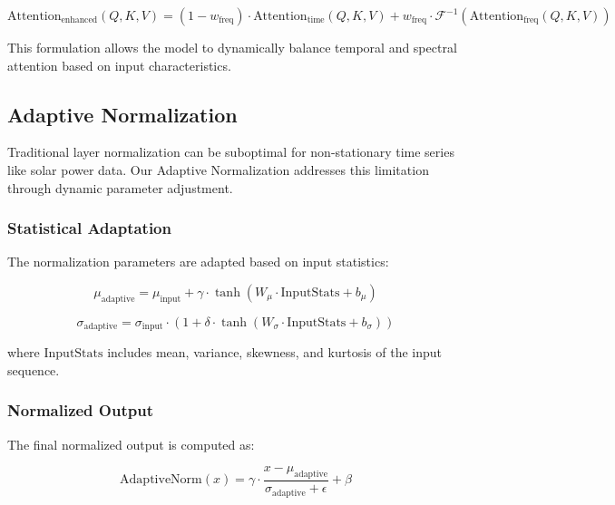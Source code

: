 \documentclass[12pt]{uomthesis}
\begin{document}
\begin{equation}
\text{Attention}_{\text{enhanced}}(Q, K, V) = (1-w_{\text{freq}}) \cdot \text{Attention}_{\text{time}}(Q, K, V) + w_{\text{freq}} \cdot \mathcal{F}^{-1}(\text{Attention}_{\text{freq}}(Q, K, V))
\end{equation}

This formulation allows the model to dynamically balance temporal and spectral attention based on input characteristics.

\subsection{Adaptive Normalization}

Traditional layer normalization can be suboptimal for non-stationary time series like solar power data. Our Adaptive Normalization addresses this limitation through dynamic parameter adjustment.

\subsubsection{Statistical Adaptation}

The normalization parameters are adapted based on input statistics:

\begin{equation}
\mu_{\text{adaptive}} = \mu_{\text{input}} + \gamma \cdot \tanh(W_{\mu} \cdot \text{InputStats} + b_{\mu})
\end{equation}

\begin{equation}
\sigma_{\text{adaptive}} = \sigma_{\text{input}} \cdot (1 + \delta \cdot \tanh(W_{\sigma} \cdot \text{InputStats} + b_{\sigma}))
\end{equation}

where $\text{InputStats}$ includes mean, variance, skewness, and kurtosis of the input sequence.

\subsubsection{Normalized Output}

The final normalized output is computed as:

\begin{equation}
\text{AdaptiveNorm}(x) = \gamma \cdot \frac{x - \mu_{\text{adaptive}}}{\sigma_{\text{adaptive}} + \epsilon} + \beta
\end{equation}
\end{document}
